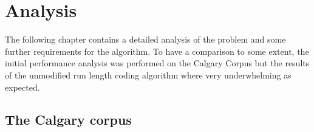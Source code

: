 
\chapter{Analysis}
\label{ch:Analysis}

\par{
The following chapter contains a detailed analysis of the problem and some further requirements for the algorithm. To have a comparison to some extent, the initial performance analysis was performed on the Calgary Corpus but the results of the unmodified run length coding algorithm where very underwhelming as expected.
}

\section{The Calgary corpus}
